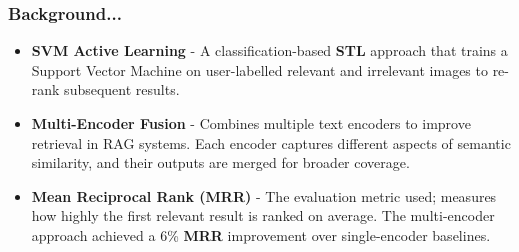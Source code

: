 \begin{frame}
\frametitle{Background...}

\begin{itemize}
     \item \textbf{SVM Active Learning} - A classification-based \textbf{STL} approach that trains a Support Vector Machine on user-labelled relevant and irrelevant images to re-rank subsequent results.
        
    \item \textbf{Multi-Encoder Fusion} - Combines multiple text encoders to improve retrieval in RAG systems. Each encoder captures different aspects of semantic similarity, and their outputs are merged for broader coverage.


    \item \textbf{Mean Reciprocal Rank (\textbf{MRR})} - The evaluation metric used; measures how highly the first relevant result is ranked on average. The multi-encoder approach achieved a 6\% \textbf{MRR} improvement over single-encoder baselines.
\end{itemize}

\end{frame}
